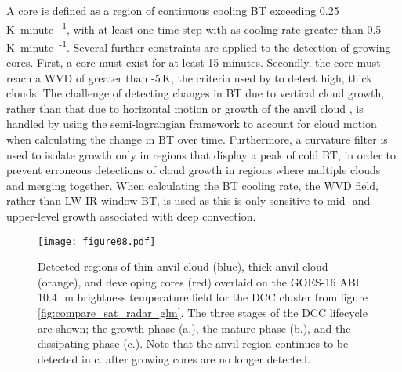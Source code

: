 A core is defined as a region of continuous cooling BT exceeding 0.25\,\unit{K minute\textsuperscript{-1}}, with at least one time step with as cooling rate greater than 0.5\,\unit{K minute\textsuperscript{-1}}.
Several further constraints are applied to the detection of growing cores.
First, a core must exist for at least 15 minutes.
Secondly, the core must reach a WVD of greater than -5\,\unit{K}, the criteria used by \citet{muller_role_2018} to detect high, thick clouds.
The challenge of detecting changes in BT due to vertical cloud growth, rather than that due to horizontal motion or growth of the anvil cloud \citep{hartung_intercomparison_2013}, is handled by using the semi-lagrangian framework to account for cloud motion when calculating the change in BT over time.
Furthermore, a curvature filter is used to isolate growth only in regions that display a peak of cold BT, in order to prevent erroneous detections of cloud growth in regions where multiple clouds and merging together.
When calculating the BT cooling rate, the WVD field, rather than LW IR window BT, is used as this is only sensitive to mid- and upper-level growth associated with deep convection.

\begin{figure}[t]
    \centering
    \texttt{[image: figure08.pdf]}
    \caption{Detected regions of thin anvil cloud (blue), thick anvil cloud (orange), and developing cores (red) overlaid on the GOES-16 ABI 10.4\,\unit{\mu m} brightness temperature field for the DCC cluster from figure \ref{fig:compare_sat_radar_glm}. The three stages of the DCC lifecycle are shown; the growth phase (a.), the mature phase (b.), and the dissipating phase (c.). Note that the anvil region continues to be detected in c. after growing cores are no longer detected.}
    \label{fig:detected_anvils}
\end{figure}

